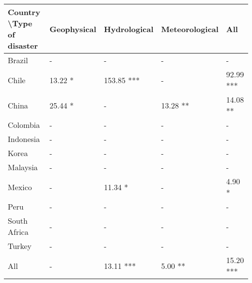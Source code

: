\begin{tabular}{lllll}
\hline
Country \textbackslash Type of disaster & Geophysical & Hydrological & Meteorological & All \\ \hline
Brazil & - & - & - & - \\
Chile & 13.22 * & 153.85 *** & - & 92.99 *** \\
China & 25.44 * & - & 13.28 ** & 14.08 ** \\
Colombia & - & - & - & - \\
Indonesia & - & - & - & - \\
Korea & - & - & - & - \\
Malaysia & - & - & - & - \\
Mexico & - & 11.34 * & - & 4.90 * \\
Peru & - & - & - & - \\
South Africa & - & - & - & - \\
Turkey & - & - & - & - \\
All & - & 13.11 *** & 5.00 ** & 15.20 *** \\ \hline
\end{tabular}